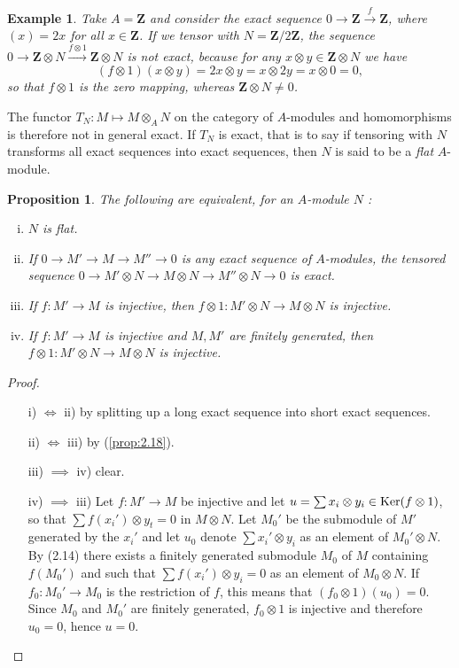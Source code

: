 \documentclass{standalone}
\newtheorem{proposition}[theorem]{Proposition}
\newtheorem*{example}{Example}
\theoremstyle{definition}
\theoremstyle{remark}
\begin{document}
\begin{example}
  Take $A=\mathbf{Z}$ and consider the exact sequence
$0 \to \mathbf{Z} \stackrel{f}{\to} \mathbf{Z}$, where $(x)=2 x$ for all
$x \in \mathbf{Z}$. If we tensor with $N=\mathbf{Z} / 2 \mathbf{Z}$, the
sequence $0 \to \mathbf{Z} \otimes N\stackrel{f \otimes
  1}{\longrightarrow} \mathbf{Z} \otimes N$ is {\itshape not} exact, 
because for any $x \otimes y \in \mathbf{Z} \otimes N$ we have
\[
  (f \otimes 1)(x \otimes y)=2 x \otimes y=x \otimes 2 y=x \otimes 0=0,
\]
so that $f \otimes 1$ is the zero mapping, whereas
$\mathbf{Z} \otimes N \neq 0$.
\end{example}
The functor $T_{N}\colon M \mapsto M \otimes_{A} N$ on the category of $A$-modules
and homomorphisms is therefore not in general exact. If $T_{N}$ is exact, that
is to say if tensoring with $N$ transforms all exact sequences into exact
sequences, then $N$ is said to be a {\itshape flat} $A$-module.
\begin{proposition}\label{prop:2.19}
  The following are equivalent, for an $A$-module $N$ :
\begin{enumerate}[i)]
\item $N$ is flat.
\item If $0 \to M' \to M \to M'' \to 0$ is any exact sequence of $A$-modules, the
tensored sequence $0 \to M' \otimes N \to M \otimes N \to M'' \otimes N \to 0$
is exact.
\item If $f: M' \to M$ is injective, then
$f \otimes 1: M' \otimes N \to M \otimes N$ is injective.
\item If $f: M' \to M$ is injective and $M, M'$ are finitely generated, then
$f \otimes 1: M' \otimes N \to M \otimes N$ is injective.
\end{enumerate}
\end{proposition}
\begin{proof}
  \phantom{}
  \begin{enumerate}
  \item[i) $\Longleftrightarrow$ ii)]by splitting up a long exact sequence into short
exact sequences.
  \item[ii) $\Longleftrightarrow$ iii)]by (\ref{prop:2.18}).
  \item[iii) $\implies$ iv)]clear.
    \item[iv) $\implies$ iii)] Let $f: M' \to M$ be injective and let
$u=\sum x_{i} \otimes y_{i} \in \operatorname{Ker}(f \otimes 1)$, so that
$\sum f(x_{i}') \otimes y_{t}=0$ in $M \otimes N$. Let $M_{0}'$ be
the submodule of $M'$ generated by the $x_{i}'$ and let $u_{0}$ denote
$\sum x_{i}' \otimes y_{i}$ as an element of $M_{0}' \otimes N$. By (2.14) there
exists a finitely generated submodule $M_{0}$ of $M$ containing
$f(M_{0}')$ and such that $\sum f(x_{i}') \otimes y_{i}=0$
as an element of $M_{0} \otimes N$. If $f_{0}: M_{0}' \to M_{0}$ is the
restriction of $f$, this means that
$(f_{0} \otimes 1)(u_{0})=0$. Since $M_{0}$ and $M_{0}'$
are finitely generated, $f_{0} \otimes 1$ is injective and therefore $u_{0}=0$,
hence $u=0$.
  \end{enumerate}
\end{proof}
\end{document}
